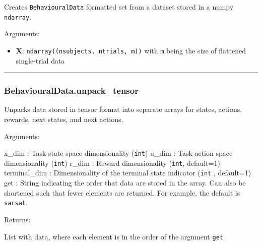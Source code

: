 \begin{Shaded}
\begin{Highlighting}[]
\end{Highlighting}
\end{Shaded}

Creates \texttt{BehaviouralData} formatted set from a dataset stored in
a numpy \texttt{ndarray}.

Arguments:

\begin{itemize}
\tightlist
\item
  \textbf{X}: \texttt{ndarray((nsubjects,\ ntrials,\ m))} with
  \texttt{m} being the size of flattened single-trial data
\end{itemize}

\begin{center}\rule{0.5\linewidth}{\linethickness}\end{center}

\subsubsection{BehaviouralData.unpack\_tensor}\label{behaviouraldata.unpack_tensor}

\begin{Shaded}
\begin{Highlighting}[]
\OperatorTok{=}\OperatorTok{=}\OperatorTok{=}\NormalTok{)}
\end{Highlighting}
\end{Shaded}

Unpacks data stored in tensor format into separate arrays for states,
actions, rewards, next states, and next actions.

Arguments:

x\_dim : Task state space dimensionality (\texttt{int}) u\_dim : Task
action space dimensionality (\texttt{int}) r\_dim : Reward
dimensionality (\texttt{int}, default=1) terminal\_dim : Dimensionality
of the terminal state indicator (\texttt{int} , default=1) get : String
indicating the order that data are stored in the array. Can also be
shortened such that fewer elements are returned. For example, the
default is \texttt{sarsat}.

Returns:

List with data, where each element is in the order of the argument
\texttt{get}

